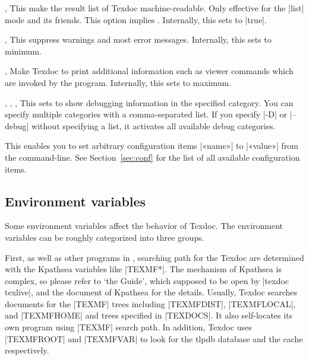 \documentclass{texdoc-doc}
\begin{document}
\begin{clopt}{, }
This make the result list of Texdoc machine-readable. Only effective for the
|list| mode and its friends. This option implies .
Internally, this sets  to |true|.
\end{clopt}

\begin{clopt}{, }
This suppress warnings and most error messages. Internally, this sets
 to minimum.
\end{clopt}

\begin{clopt}{, }
Make Texdoc to print additional information such as viewer commands which are
invoked by the program. Internally, this sets  to maximum.
\end{clopt}

\begin{clopt}{%
  , ,
  , }
This sets  to show debugging information in the specified
category. You can specify multiple categories with a comma-separated list. If
you specify |-D| or |--debug| without specifying a list, it activates all
available debug categories.
\end{clopt}

\begin{clopt}{}
This enables you to set arbitrary configuration items |«name»| to |«value»|
from the command-line. See Section~\ref{sec:conf} for the list of all available
configuration items.
\end{clopt}

\subsection{Environment variables}
\label{sec:envvar}

Some environment variables affect the behavior of Texdoc. The environment
variables can be roughly categorized into three groups.

First, as well as other programs in {\TL}, searching path for the Texdoc are
determined with the Kpathsea variables like |TEXMF*|. The mechanism of Kpathsea
is complex, so please refer to `the {\TL} Guide', which supposed to be open by
|texdoc texlive|, and the document of Kpathsea for the details. Usually, Texdoc
searches documents for the |TEXMF| trees including |TEXMFDIST|, |TEXMFLOCAL|,
and |TEXMFHOME| and trees specified in |TEXDOCS|. It also self-locates its own
program using |TEXMF| search path. In addition, Texdoc uses |TEXMFROOT| and
|TEXMFVAR| to look for the tlpdb database and the cache respectively.
\end{document}
